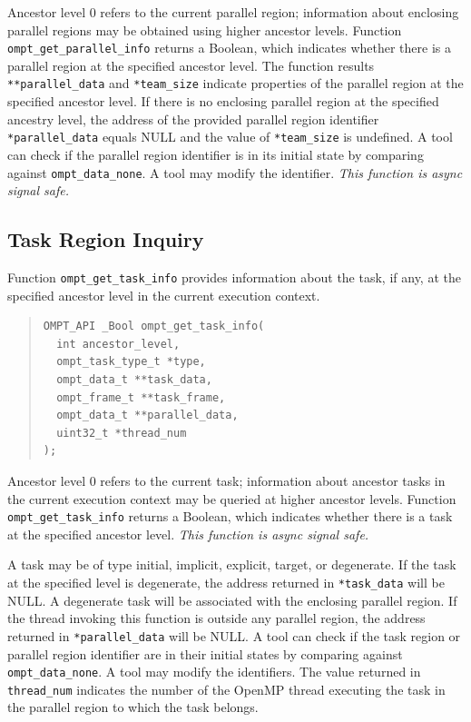 \documentclass{article}
\begin{document}
\noindent 
Ancestor level 0 refers to the current parallel region; 
information about enclosing parallel regions may be obtained using higher ancestor levels. 
Function \verb|ompt_get_parallel_info| returns a Boolean, which indicates whether there is a parallel region at the specified ancestor level.
The function results \verb|**parallel_data| and \verb|*team_size| indicate properties of the parallel region at the specified ancestor level.
If there is no enclosing parallel region at the specified ancestry level, the address of the provided parallel region identifier \verb|*parallel_data| equals NULL and the value of \verb|*team_size| is undefined.
A tool can check if the parallel region identifier is in its initial state by comparing against \verb|ompt_data_none|.
A tool may modify the identifier.
{\em This function is async signal safe.}
 
\subsection{Task Region Inquiry}
\label{sec:task-region}

Function \verb|ompt_get_task_info| provides information about the task, if any, at the specified ancestor level in the current execution context.

\begin{quote}
\begin{verbatim}
OMPT_API _Bool ompt_get_task_info(
  int ancestor_level,
  ompt_task_type_t *type,
  ompt_data_t **task_data,
  ompt_frame_t **task_frame,
  ompt_data_t **parallel_data,
  uint32_t *thread_num
);
\end{verbatim}
\end{quote}
\noindent
Ancestor level 0 refers to the current task; information about ancestor tasks in the current execution context may be queried at higher ancestor levels. 
Function \verb|ompt_get_task_info| returns a Boolean, which indicates whether there is a task at the specified ancestor level.
{\em This function is async signal safe.} 

A task may be of type initial, implicit, explicit,  target, or degenerate. 
If the task at the specified level is degenerate, the address returned in \verb|*task_data| will be NULL.
A degenerate task will be associated with the enclosing parallel region. 
If the thread invoking this function is outside any parallel region, the address returned in \verb|*parallel_data| will be NULL.
A tool can check if the task region or parallel region identifier are in their initial states by comparing against \verb|ompt_data_none|.
A tool may modify the identifiers.
The value returned in \verb|thread_num| indicates the number of the OpenMP thread executing the task in the parallel region to which the task belongs.
\end{document}
